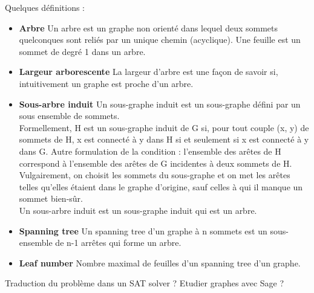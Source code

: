 \documentclass{article}
\begin{document}
Quelques définitions :

\begin{itemize}
\item \textbf{Arbre}
Un arbre est un graphe non orienté dans lequel deux sommets quelconques sont reliés par un unique chemin (acyclique). Une feuille est un sommet de degré 1 dans un arbre.

\item \textbf{Largeur arborescente}
La largeur d'arbre est une façon de savoir si, intuitivement un graphe est proche d'un arbre.

\item \textbf{Sous-arbre induit}
Un sous-graphe induit est un sous-graphe défini par un sous ensemble de sommets. 
\\
Formellement, H est un sous-graphe induit de G si, pour tout couple (x, y) de sommets de H, x est connecté à y dans H si et seulement si x est connecté à y dans G. Autre formulation de la condition : l'ensemble des arêtes de H correspond à l'ensemble des arêtes de G incidentes à deux sommets de H.
\\
Vulgairement, on choisit les sommets du sous-graphe et on met les arêtes telles qu'elles étaient dans le graphe d'origine, sauf celles à qui il manque un sommet bien-sûr. 
\\
Un sous-arbre induit est un sous-graphe induit qui est un arbre.

\item \textbf{Spanning tree}
Un spanning tree d'un graphe à n sommets est un sous-ensemble de n-1 arrêtes qui forme un arbre.

\item \textbf{Leaf number}
Nombre maximal de feuilles d'un spanning tree d'un graphe.

\end{itemize}

Traduction du problème dans un SAT solver ?
Etudier graphes avec Sage ?

\end{document}
